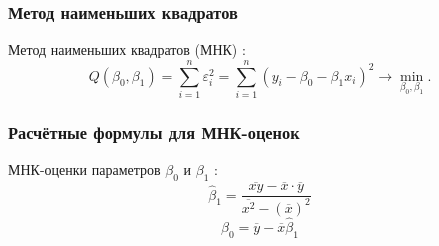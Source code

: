 \documentclass[12pt]{article}
\begin{document}
    \subsubsection{Метод наименьших квадратов}
    Метод наименьших квадратов (МНК) \cite{theory}:
    \begin{equation}
        Q(\beta_0, \beta_1) = \sum_{i = 1}^{n}\varepsilon_{i}^{2} = \sum_{i = 1}^{n}(y_i - \beta_0 - \beta_1x_i)^2 \rightarrow \min_{\beta_0, \beta_1}.
    \end{equation}

    \subsubsection{Расчётные формулы для МНК-оценок}
    МНК-оценки параметров $\beta_0$ и $\beta_1$ \cite{theory}:
    \begin{equation}
        \hat{\beta}_1 = \frac{\overline{xy} - \overline{x} \cdot \overline{y}}{\overline{x^2} - (\overline{x})^2}
        \label{mnk1}
    \end{equation}
    \begin{equation}
        \hat{\beta}_0 = \overline{y} - \overline{x}\hat{\beta}_1
        \label{mnk0}
    \end{equation}
\end{document}
